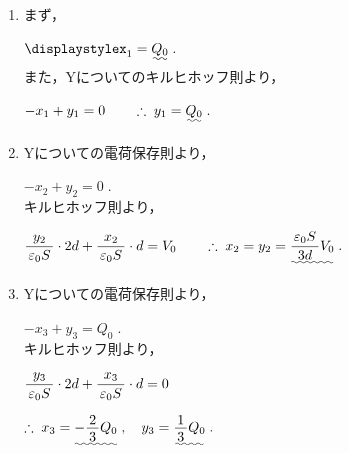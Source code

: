 \documentclass[../../../uem_phy_std_a.tex]{subfiles}
\begin{document}
    \begin{enumerate}

        \item まず，
            
            \myspaceb%
            $\displaystyle%
                x_1 = \uwave{Q_0} \;.
            $\\
            また，Yについてのキルヒホッフ則より，
            
            \myspaceb%
            $\displaystyle%
                -x_1 + y_1 = 0 \qquad \therefore \; y_1 = \uwave{Q_0} \;.
            $            
        \item Yについての電荷保存則より，
            
            \myspaceb%
            $\displaystyle%
                -x_2 + y_2 = 0 \;.
            $\\
            キルヒホッフ則より，
            
            \myspaceb%
            $\displaystyle%
                \myfracc{y_2}{\varepsilon_0 S} \cdot 2d + %
                \myfracc{x_2}{\varepsilon_0 S} \cdot d = V_0%
                \qquad \therefore \; x_2 = y_2%
                = \uwave{\myfracc{\varepsilon_0 S}{3d} V_0} \;.
            $
        \item Yについての電荷保存則より，
            
            \myspaceb%
            $\displaystyle%
                -x_3 + y_3 = Q_0 \;.
            $\\
            キルヒホッフ則より，
            
            \myspaceb%
            $\displaystyle%
                \myfracc{y_3}{\varepsilon_0 S} \cdot 2d + %
                \myfracc{x_3}{\varepsilon_0 S} \cdot d = 0
            $

            \myspaceb%
            $\displaystyle%
                \therefore \; x_3 = \uwave{- \myfraca{2}{3} Q_0} \;,%
                \quad y_3 = \uwave{\myfraca{1}{3} Q_0} \;.
            $
    \end{enumerate}
\end{document}
